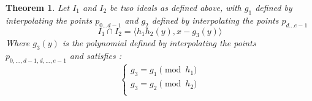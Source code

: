 \documentclass{article}
\newtheorem{theorem}{Theorem}[section]
\begin{document}
\begin{theorem} 
    Let $I_{1}$ and $I_{2}$ be two ideals as defined above, with $g_{1}$ defined by interpolating the points $p_{0...d-1}$ and $g_{2}$ defined by interpolating the points $p_{d...e-1}$
    \begin{displaymath}
        I_{1} \cap I_{2} = \langle h_{1}h_{2}(y), x - g_{3}(y) \rangle
    \end{displaymath}
    Where $g_{3}(y)$ is the polynomial defined by interpolating the points $p_{0,...,d-1,d,...,e-1}$ and satisfies :
    \begin{displaymath}
    \left\{
    \begin{array}{ll}
        g_{3} = g_{1} \pmod {h_{1}} \\
        g_{3} = g_{2} \pmod {h_{2}} \\
    \end{array}
    \right.
    \end{displaymath} 
\end{theorem}
\end{document}
